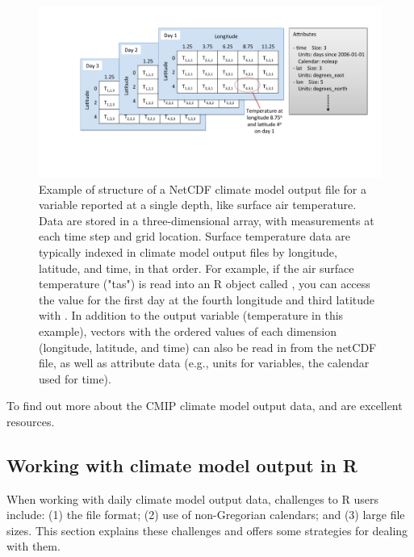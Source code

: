 \begin{figure}
\begin{center}
\includegraphics[width = \textwidth]{netcdf_figure}
\end{center}
\caption{Example of structure of a NetCDF climate model output file for a variable reported at a single depth, like surface air temperature. Data are stored in a three-dimensional array, with measurements at each time step and grid location. Surface temperature data are typically indexed in climate model output files by longitude, latitude, and time, in that order. For example, if the air surface temperature ("tas") is read into an R object called , you can access the value for the first day at the fourth longitude and third latitude with . In addition to the output variable (temperature in this example), vectors with the ordered values of each dimension (longitude, latitude, and time) can also be read in from the netCDF file, as well as attribute data (e.g., units for variables, the calendar used for time).}
\label{fig:netcdfexample}
\end{figure}

To find out more about the CMIP climate model output data,
\citet{taylor2012overview} and \citet{meehl2007wcrp} are excellent
resources.

\subsection{Working with climate model output in
R}\label{working-with-climate-model-output-in-r}

When working with daily climate model output data, challenges to R users
include: (1) the file format; (2) use of non-Gregorian calendars; and
(3) large file sizes. This section explains these challenges and offers
some strategies for dealing with them.

